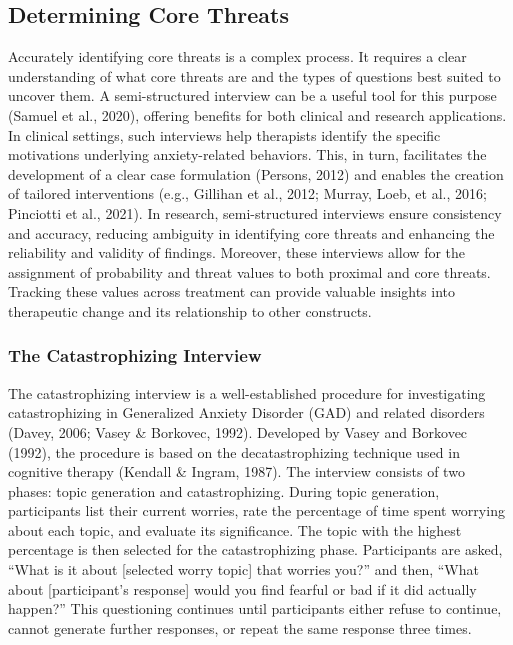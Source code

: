 \documentclass[
  man,floatsintext]{apa7}
\begin{document}
\subsection{Determining Core Threats}\label{determining-core-threats}

Accurately identifying core threats is a complex process.
It requires a clear understanding of what core threats are and the types of questions best suited to uncover them.
A semi-structured interview can be a useful tool for this purpose (Samuel et al., 2020), offering benefits for both clinical and research applications.
In clinical settings, such interviews help therapists identify the specific motivations underlying anxiety-related behaviors.
This, in turn, facilitates the development of a clear case formulation (Persons, 2012) and enables the creation of tailored interventions (e.g., Gillihan et al., 2012; Murray, Loeb, et al., 2016; Pinciotti et al., 2021).
In research, semi-structured interviews ensure consistency and accuracy, reducing ambiguity in identifying core threats and enhancing the reliability and validity of findings.
Moreover, these interviews allow for the assignment of probability and threat values to both proximal and core threats.
Tracking these values across treatment can provide valuable insights into therapeutic change and its relationship to other constructs.

\subsubsection{The Catastrophizing Interview}\label{the-catastrophizing-interview}

The catastrophizing interview is a well-established procedure for investigating catastrophizing in Generalized Anxiety Disorder (GAD) and related disorders (Davey, 2006; Vasey \& Borkovec, 1992).
Developed by Vasey and Borkovec (1992), the procedure is based on the decatastrophizing technique used in cognitive therapy (Kendall \& Ingram, 1987).
The interview consists of two phases: topic generation and catastrophizing.
During topic generation, participants list their current worries, rate the percentage of time spent worrying about each topic, and evaluate its significance.
The topic with the highest percentage is then selected for the catastrophizing phase.
Participants are asked, ``What is it about {[}selected worry topic{]} that worries you?'' and then, ``What about {[}participant's response{]} would you find fearful or bad if it did actually happen?'' This questioning continues until participants either refuse to continue, cannot generate further responses, or repeat the same response three times.
\end{document}
